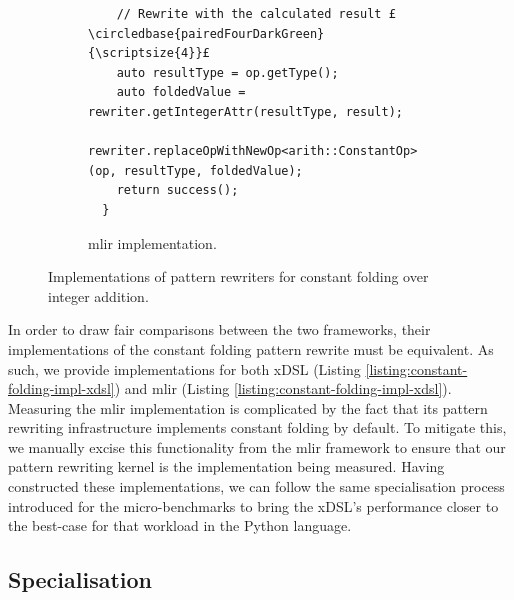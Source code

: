 \begin{figure}[H]
\begin{subfigure}[b]{0.5\textwidth}
\begin{verbatim}
    // Rewrite with the calculated result £\circledbase{pairedFourDarkGreen}{\scriptsize{4}}£
    auto resultType = op.getType();
    auto foldedValue = rewriter.getIntegerAttr(resultType, result);
    rewriter.replaceOpWithNewOp<arith::ConstantOp>(op, resultType, foldedValue);
    return success();
  }
        \end{verbatim}
        \captionsetup{name=Listing}
        \caption{\ac{mlir} implementation.}
        \label{listing:constant-folding-impl-mlir}
    \end{subfigure}
    \vspace{1em}
    \captionsetup{name=Listing}
    \caption{Implementations of pattern rewriters for constant folding over integer addition.}
    \label{listing:constant-folding-impl}
\end{figure}

In order to draw fair comparisons between the two frameworks, their implementations of the constant folding pattern rewrite must be equivalent.
As such, we provide implementations for both xDSL (Listing \ref{listing:constant-folding-impl-xdsl}) and \ac{mlir} (Listing \ref{listing:constant-folding-impl-xdsl}).
Measuring the \ac{mlir} implementation is complicated by the fact that its pattern rewriting infrastructure implements constant folding by default. To mitigate this, we manually excise this functionality from the \ac{mlir} framework to ensure that our pattern rewriting kernel is the implementation being measured.
Having constructed these implementations, we can follow the same specialisation process introduced for the micro-benchmarks to bring the xDSL's performance closer to the best-case for that workload in the Python language.


\subsection{Specialisation}
\label{sec:specialising-pattern-rewriting-specialisation}

